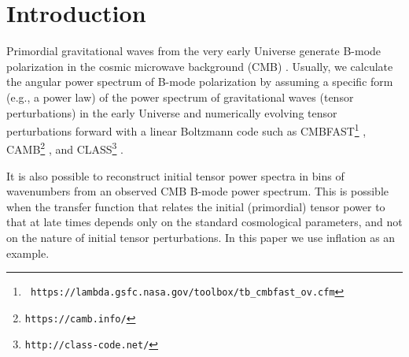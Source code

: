 \documentclass[tightenlines,floats,aps,nofootinbib,prd,onecolumn,preprintnumbers]{revtex4}
\begin{document}

\maketitle

\section{Introduction}
Primordial gravitational waves from the very early Universe
generate B-mode polarization in the cosmic microwave background (CMB)
\cite{Seljak:1996gy,Kamionkowski:1996zd}. Usually,
we calculate the angular power spectrum of B-mode polarization by
assuming a specific form (e.g., a power law) of the power spectrum of
gravitational waves (tensor perturbations) in the early Universe and numerically
evolving tensor perturbations forward with a linear Boltzmann code such
as CMBFAST\footnote{\tt
https://lambda.gsfc.nasa.gov/toolbox/tb\_cmbfast\_ov.cfm}
\cite{Seljak:1996is}, CAMB\footnote{\tt https://camb.info/}
\cite{Lewis:1999bs}, and CLASS\footnote{\tt http://class-code.net/} \cite{Blas:2011rf}.

It is also possible to reconstruct initial tensor power spectra in
bins of wavenumbers from an observed CMB B-mode power spectrum. This is
possible when the transfer function that relates the initial
(primordial) tensor power to that at late times depends only on
the standard cosmological parameters, and not on the nature of initial
tensor perturbations. In this paper we use inflation
\cite{Brout:1977ix,Starobinsky:1980te,Sato:1980yn,Guth:1980zm,Albrecht:1982wi,Linde:1981mu}
as an example.
\end{document}
